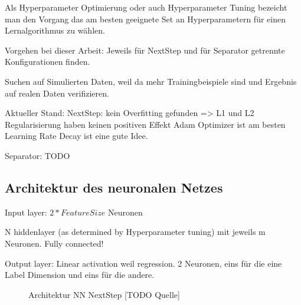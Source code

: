 Als Hyperparameter Optimierung oder auch Hyperparameter Tuning bezeicht man den Vorgang das am besten geeignete Set an 
Hyperparametern für einen Lernalgorithmus zu wählen.


Vorgehen bei dieser Arbeit: Jeweils für NextStep und für Separator getrennte Konfigurationen finden.

Suchen auf Simulierten Daten, weil da mehr Trainingbeispiele sind und Ergebnis auf realen Daten verifizieren.



Aktueller Stand:
NextStep: kein Overfitting gefunden => L1 und L2 Regularisierung haben keinen positiven Effekt
Adam Optimizer ist am besten
Learning Rate Decay ist eine gute Idee. 

Separator: TODO

\subsection{Architektur des neuronalen Netzes}

Input layer: \(2 * FeatureSize\) Neuronen

N hiddenlayer (as determined by Hyperparameter tuning) mit jeweils m Neuronen.
Fully connected!

Output layer:
Linear activation weil regression.
2 Neuronen, eins für die eine Label Dimension und eins für die andere.

\begin{figure}
	\caption{Architektur NN NextStep [TODO Quelle]}
	\label{fig:netArchitecture}
\end{figure}

